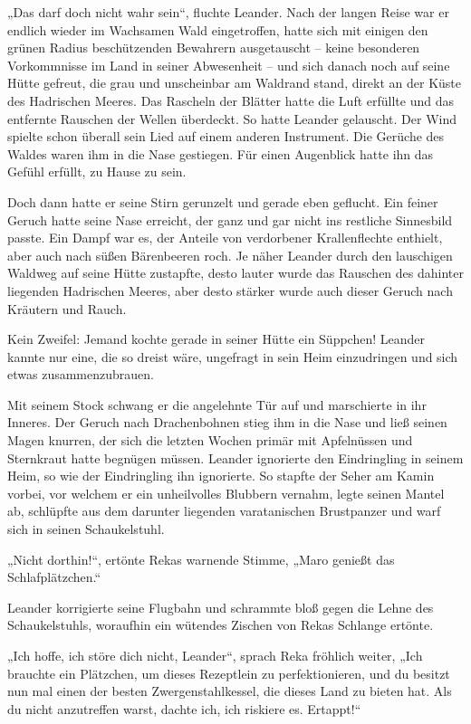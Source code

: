 \trennzeichen



„Das darf doch nicht wahr sein“, fluchte Leander. Nach der langen Reise war er endlich wieder im Wachsamen Wald eingetroffen, hatte sich mit einigen den grünen Radius beschützenden Bewahrern ausgetauscht – keine besonderen Vorkommnisse im Land in seiner Abwesenheit – und sich danach noch auf seine Hütte gefreut, die grau und unscheinbar am Waldrand stand, direkt an der Küste des Hadrischen Meeres. Das Rascheln der Blätter hatte die Luft erfüllte und das entfernte Rauschen der Wellen überdeckt. So hatte Leander gelauscht. Der Wind spielte schon überall sein Lied auf einem anderen Instrument. Die Gerüche des Waldes waren ihm in die Nase gestiegen. Für einen Augenblick hatte ihn das Gefühl erfüllt, zu Hause zu sein.

Doch dann hatte er seine Stirn gerunzelt und gerade eben geflucht. Ein feiner Geruch hatte seine Nase erreicht, der ganz und gar nicht ins restliche Sinnesbild passte. Ein Dampf war es, der Anteile von verdorbener Krallenflechte enthielt, aber auch nach süßen Bärenbeeren roch. Je näher Leander durch den lauschigen Waldweg auf seine Hütte zustapfte, desto lauter wurde das Rauschen des dahinter liegenden Hadrischen Meeres, aber desto stärker wurde auch dieser Geruch nach Kräutern und Rauch.

Kein Zweifel: Jemand kochte gerade in seiner Hütte ein Süppchen! Leander kannte nur eine, die so dreist wäre, ungefragt in sein Heim einzudringen und sich etwas zusammenzubrauen.

Mit seinem Stock schwang er die angelehnte Tür auf und marschierte in ihr Inneres. Der Geruch nach Drachenbohnen stieg ihm in die Nase und ließ seinen Magen knurren, der sich die letzten Wochen primär mit Apfelnüssen und Sternkraut hatte begnügen müssen. Leander ignorierte den Eindringling in seinem Heim, so wie der Eindringling ihn ignorierte. So stapfte der Seher am Kamin vorbei, vor welchem er ein unheilvolles Blubbern vernahm, legte seinen Mantel ab, schlüpfte aus dem darunter liegenden varatanischen Brustpanzer und warf sich in seinen Schaukelstuhl.

„Nicht dorthin!“, ertönte Rekas warnende Stimme, „Maro genießt das Schlafplätzchen.“

Leander korrigierte seine Flugbahn und schrammte bloß gegen die Lehne des Schaukelstuhls, woraufhin ein wütendes Zischen von Rekas Schlange ertönte.

„Ich hoffe, ich störe dich nicht, Leander“, sprach Reka fröhlich weiter, „Ich brauchte ein Plätzchen, um dieses Rezeptlein zu perfektionieren, und du besitzt nun mal einen der besten Zwergenstahlkessel, die dieses Land zu bieten hat. Als du nicht anzutreffen warst, dachte ich, ich riskiere es. Ertappt!“

